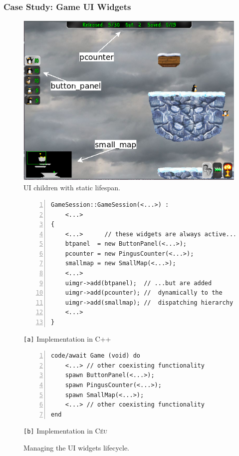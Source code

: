 \documentclass{vgtc}                          %
\newcommand{\CEU}{\textsc{C\'{e}u}\xspace}
\newcommand{\code}[1] {{\small{\texttt{#1}}}}
\newcommand{\ax}{\code{[a]}\xspace}
\newcommand{\bx}{\code{[b]}\xspace}
\begin{document}
\subsubsection{Case Study: Game UI Widgets}

\begin{figure}[t]
\centering
\includegraphics[width=\columnwidth]{game-session-arrows}
\caption{UI children with static lifespan.
\label{fig.ui}
}
\end{figure}

\begin{figure}[t]
\begin{minipage}[t]{0.54\linewidth}
\begin{lstlisting}[numbers=left,xleftmargin=3em]
GameSession::GameSession(<...>) :
    <...>
{
    <...>      // these widgets are always active...
    btpanel  = new ButtonPanel(<...>);
    pcounter = new PingusCounter(<...>);
    smallmap = new SmallMap(<...>);
    <...>
    uimgr->add(btpanel);  // ...but are added
    uimgr->add(pcounter); //  dynamically to the
    uimgr->add(smallmap); //  dispatching hierarchy
    <...>
}
\end{lstlisting}
\centering\small{\ax Implementation in C++}
\end{minipage}
%
\begin{minipage}[t]{0.46\linewidth}
\begin{lstlisting}[numbers=left,xleftmargin=3em]
code/await Game (void) do
    <...> // other coexisting functionality
    spawn ButtonPanel(<...>);
    spawn PingusCounter(<...>);
    spawn SmallMap(<...>);
    <...> // other coexisting functionality
end
\end{lstlisting}
\centering\small{\bx Implementation in \CEU}
\end{minipage}
\caption{ Managing the UI widgets lifecycle.
\label{lst.pingus}
}
\end{figure}
\end{document}
